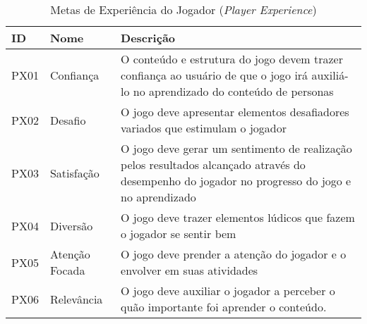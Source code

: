 \begin{table}[htbp]
\centering
\caption{Metas de Experiência do Jogador (\textit{Player Experience})}
\label{tab:Table_px}
\begin{tabular}{|l|l|p{9cm}|}
\hline
    ID   & Nome                     & Descrição\\ \hline
    PX01 & Confiança                & O conteúdo e estrutura do jogo devem trazer confiança ao usuário de que o jogo irá auxiliá-lo no aprendizado do conteúdo de personas \\ \hline
    PX02 & Desafio                  & O jogo deve apresentar elementos desafiadores variados que estimulam o jogador\\ \hline
    PX03 & Satisfação               & O jogo deve gerar um sentimento de realização pelos resultados alcançado através do desempenho do jogador no progresso do jogo e no aprendizado \\ \hline
    PX04 & Diversão                 & O jogo deve trazer elementos lúdicos que fazem o jogador se sentir bem \\ \hline
    PX05 & Atenção Focada           & O jogo deve prender a atenção do jogador e o envolver em suas atividades \\ \hline
    PX06 & Relevância   & O jogo deve auxiliar o jogador a perceber o quão importante foi aprender o conteúdo.\\ \hline
    
\end{tabular}
\end{table}